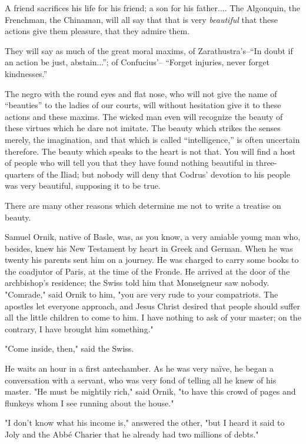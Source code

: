 A friend sacrifices his life for his friend; a son for his father....
The Algonquin, the Frenchman, the Chinaman, will all say that that is
very \textit{beautiful} that these actions give them pleasure, that they
admire them.

They will say as much of the great moral maxims, of Zarathustra's--\enquote{In
doubt if an action be just, abstain...}; of Confucius'-- \enquote{Forget
injuries, never forget kindnesses.}

The negro with the round eyes and flat nose, who will not give the name
of \enquote{beauties} to the ladies of our courts, will without hesitation give
it to these actions and these maxims. The wicked man even will recognize
the beauty of these virtues which he dare not imitate. The beauty which
strikes the senses merely, the imagination, and that which is called
\enquote{intelligence,} is often uncertain therefore. The beauty which speaks to
the heart is not that. You will find a host of people who will tell you
that they have found nothing beautiful in three-quarters of the Iliad;
but nobody will deny that Codrus' devotion to his people was very
beautiful, supposing it to be true.

There are many other reasons which determine me not to write a treatise
on beauty.






Samuel Ornik, native of Basle, was, as you know, a very amiable young
man who, besides, knew his New Testament by heart in Greek and German.
When he was twenty his parents sent him on a journey. He was charged to
carry some books to the coadjutor of Paris, at the time of the Fronde.
He arrived at the door of the archbishop's residence; the Swiss told him
that Monseigneur saw nobody. "Comrade," said Ornik to him, "you are very
rude to your compatriots. The apostles let everyone approach, and Jesus
Christ desired that people should suffer all the little children to come
to him. I have nothing to ask of your master; on the contrary, I have
brought him something."

"Come inside, then," said the Swiss.

He waits an hour in a first antechamber. As he was very naïve, he began
a conversation with a servant, who was very fond of telling all he knew
of his master. "He must be mightily rich," said Ornik, "to have this
crowd of pages and flunkeys whom I see running about the house."

"I don't know what his income is," answered the other, "but I heard it
said to Joly and the Abbé Charier that he already had two millions of
debts."

